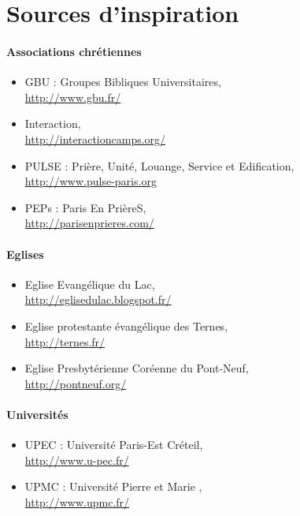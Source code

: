 \section{Sources d'inspiration}

	\paragraph{Associations chrétiennes}
	
	\begin{itemize}
	\item GBU : Groupes Bibliques Universitaires,\\
		\url{http://www.gbu.fr/}
	\item Interaction,\\
		\url{http://interactioncamps.org/}
	\item PULSE : Prière, Unité, Louange, Service et Edification,\\
		\url{http://www.pulse-paris.org}
	\item PEPs : Paris En PrièreS,\\
		\url{http://parisenprieres.com/}
	\end{itemize}
	
	\paragraph{Eglises}
	
	\begin{itemize}
	\item Eglise Evangélique du Lac,\\
		\url{http://eglisedulac.blogspot.fr/}
	\item Eglise protestante évangélique des Ternes,\\
		\url{http://ternes.fr/} %
	\item Eglise Presbytérienne Coréenne du Pont-Neuf,\\
		\url{http://pontneuf.org/}
	\end{itemize}
	
	\paragraph{Universités}
	
	\begin{itemize}
    \item UPEC : Université Paris-Est Créteil,\\
        \url{http://www.u-pec.fr/}
	\item UPMC : Université Pierre et Marie ,\\
        \url{http://www.upmc.fr/}
	\end{itemize}
	
	
